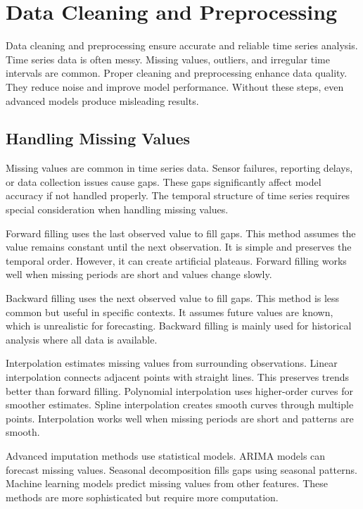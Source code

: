 \section{Data Cleaning and Preprocessing}

Data cleaning and preprocessing ensure accurate and reliable time series analysis. Time series data is often messy. Missing values, outliers, and irregular time intervals are common. Proper cleaning and preprocessing enhance data quality. They reduce noise and improve model performance. Without these steps, even advanced models produce misleading results.

\subsection{Handling Missing Values}

Missing values are common in time series data. Sensor failures, reporting delays, or data collection issues cause gaps. These gaps significantly affect model accuracy if not handled properly. The temporal structure of time series requires special consideration when handling missing values.

Forward filling uses the last observed value to fill gaps. This method assumes the value remains constant until the next observation. It is simple and preserves the temporal order. However, it can create artificial plateaus. Forward filling works well when missing periods are short and values change slowly.

Backward filling uses the next observed value to fill gaps. This method is less common but useful in specific contexts. It assumes future values are known, which is unrealistic for forecasting. Backward filling is mainly used for historical analysis where all data is available.

Interpolation estimates missing values from surrounding observations. Linear interpolation connects adjacent points with straight lines. This preserves trends better than forward filling. Polynomial interpolation uses higher-order curves for smoother estimates. Spline interpolation creates smooth curves through multiple points. Interpolation works well when missing periods are short and patterns are smooth.

Advanced imputation methods use statistical models. ARIMA models can forecast missing values. Seasonal decomposition fills gaps using seasonal patterns. Machine learning models predict missing values from other features. These methods are more sophisticated but require more computation.

